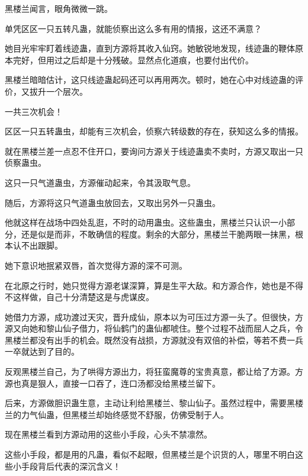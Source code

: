 \begin{this_body}
黑楼兰闻言，眼角微微一跳。

单凭区区一只五转凡蛊，就能侦察出这么多有用的情报，这还不满意？

她目光牢牢盯着线迹蛊，直到方源将其收入仙窍。她敏锐地发现，线迹蛊的鞭体原本完好，但用过之后却是十分残破。显然点化道痕，也要付出代价。

黑楼兰暗暗估计，这只线迹蛊起码还可以再用两次。顿时，她在心中对线迹蛊的评价，又拔升一个层次。

一共三次机会！

区区一只五转蛊虫，却能有三次机会，侦察六转级数的存在，获知这么多的情报。

就在黑楼兰差一点忍不住开口，要询问方源关于线迹蛊卖不卖时，方源又取出一只侦察蛊虫。

这只一只气道蛊虫，方源催动起来，令其汲取气息。

随后，方源将这只气道蛊虫放回去，又取出另外一只蛊虫。

他就这样在战场中四处乱逛，不时的动用蛊虫。这些蛊虫，黑楼兰只认识一小部分，还是似是而非，不敢确信的程度。剩余的大部分，黑楼兰干脆两眼一抹黑，根本认不出跟脚。

她下意识地抿紧双唇，首次觉得方源的深不可测。

在北原之行时，她只觉得方源老谋深算，算是生平大敌。和方源合作，她也是不得不这样做，自己十分清楚这是与虎谋皮。

她借力方源，成功渡过天灾，晋升成仙，原本以为可压过方源一头了。但很快，方源又向她和黎山仙子借力，将仙鹤门的蛊仙都唬住。整个过程不战而屈人之兵，令黑楼兰都没有出手的机会。既然没有战损，方源就没有双倍的补偿，等若不费一兵一卒就达到了目的。

反观黑楼兰自己，为了哄得方源出力，将狂蛮魔尊的宝贵真意，都让给了方源。方源也真是狠人，直接一口吞了，连口汤都没给黑楼兰留下。

后来，方源做胆识蛊生意，主动让利给黑楼兰、黎山仙子。虽然过程中，需要黑楼兰的力气仙蛊，但黑楼兰却始终感觉不舒服，仿佛受制于人。

现在黑楼兰看到方源动用的这些小手段，心头不禁凛然。

这些小手段，都是用的凡蛊，看似不起眼，但黑楼兰是个识货的人，哪里不明白这些小手段背后代表的深沉含义！

\end{this_body}

